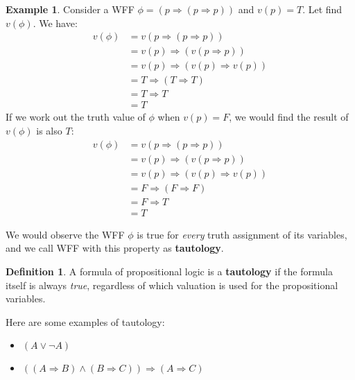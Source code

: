 \documentclass[11pt]{article}
\theoremstyle{definition}
\newtheorem{defn}{Definition}[subsection]
\newtheorem{eg}{Example}[subsection]
\begin{document}
\begin{eg}
    Consider a WFF $\phi=(p \Rightarrow (p \Rightarrow p))$ and $v(p)=T$. Let find $v(\phi)$.
    We have:
    \begin{equation}
        \begin{split}
            v(\phi) &= v(p \Rightarrow (p \Rightarrow p))\\
                    &= v(p) \Rightarrow (v(p \Rightarrow p))\\
                    &= v(p) \Rightarrow (v(p) \Rightarrow v(p))\\
                    &= T \Rightarrow (T \Rightarrow T)\\
                    &= T \Rightarrow T\\
                    &= T
        \end{split}
    \end{equation}
    If we work out the truth value of $\phi$ when $v(p)=F$, we would find the result of $v(\phi)$ is also $T$:
    \begin{equation}
        \begin{split}
            v(\phi) &= v(p \Rightarrow (p \Rightarrow p))\\
                    &= v(p) \Rightarrow (v(p \Rightarrow p))\\
                    &= v(p) \Rightarrow (v(p) \Rightarrow v(p))\\
                    &= F \Rightarrow (F \Rightarrow F)\\
                    &= F \Rightarrow T\\
                    &= T
        \end{split}
    \end{equation}
\end{eg}

We would observe the WFF $\phi$ is true for \textit{every} truth assignment of its variables, and we call WFF with this property as \textbf{tautology}.

\begin{shaded}
\begin{defn}
    A formula of propositional logic is a \textbf{tautology} if the formula itself is always \textit{true}, regardless of which valuation is used for the propositional variables. 
\end{defn}
\end{shaded}

Here are some examples of tautology:
\begin{itemize}
    \item $(A \vee \neg A)$
    \item $((A \Rightarrow B) \wedge (B \Rightarrow C)) \Rightarrow (A \Rightarrow C)$
\end{itemize}
\end{document}
